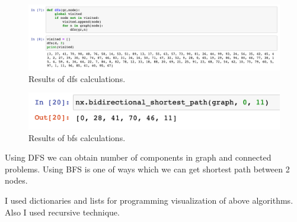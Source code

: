 \documentclass[a4paper,article,14pt]{extarticle}
\begin{document}
	\begin{figure}[h!]
		\centering
		\includegraphics[scale=0.35]{dfs.png}
		\caption{Results of dfs calculations.}
		\label{dfs}
	\end{figure} 
	
	\begin{figure}[h]
		\centering
		\includegraphics[scale=0.35]{bfs.png}
		\caption{Results of bfs calculations.}
		\label{bfs}
	\end{figure} 
	
	Using DFS we can obtain number of components in graph and connected problems. Using BFS is one of ways which we can get shortest path between 2 nodes.
	
	I used dictionaries and lists for programming visualization of above algorithms. Also I used recursive technique.

	
\end{document}
